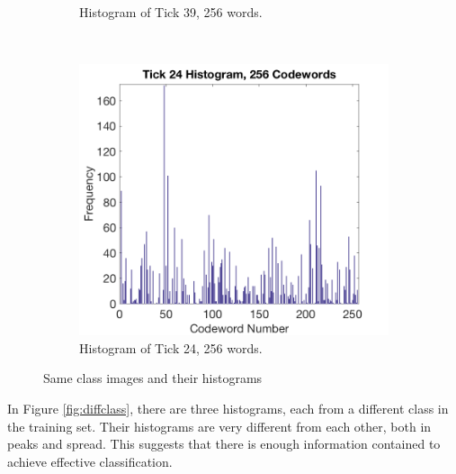 \documentclass[a4paper, 10pt, conference]{ieeeconf}
\begin{document}
\begin{figure}[!ht]
\begin{subfigure}{0.45\linewidth}
      \caption{Histogram of Tick 39, 256 words.}
      \label{fig:sameclassd}
    \end{subfigure}
  	\\
    \begin{subfigure}{0.45\linewidth}
      \includegraphics[width=\textwidth]{img/tick24_256}
      \caption{Histogram of Tick 24, 256 words.}
      \label{fig:sameclassf}
    \end{subfigure}

  \caption{Same class images and their histograms}
  \label{fig:sameclass}
\end{figure}

In Figure \ref{fig:diffclass}, there are three histograms, each from a different class in the training set. Their histograms are very different from each other, both in peaks and spread. This suggests that there is enough information contained to achieve effective classification.
\end{document}

